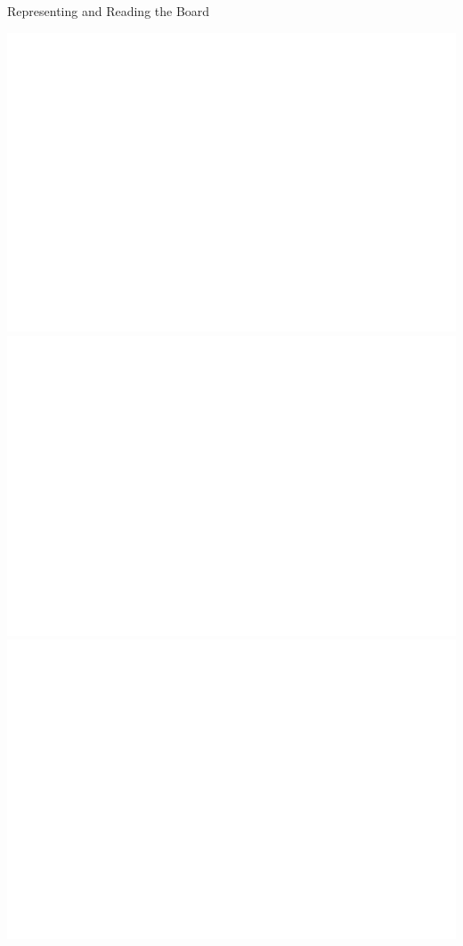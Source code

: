 \documentclass{beamer}
\begin{document}
\begin{frame}{Representing and Reading the Board}
\begin{overprint}
 \includegraphics[width=\textwidth]{parser1}
 \includegraphics[width=\textwidth]{parser2}
 \includegraphics[width=\textwidth]{parser3}

\end{overprint}
\end{frame}
\end{document}
